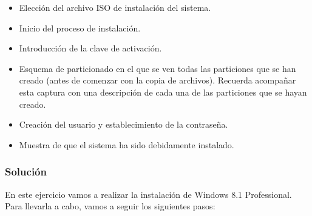 \begin{itemize}
    \item Elección del archivo ISO de instalación del sistema.
    \item Inicio del proceso de instalación.
    \item Introducción de la clave de activación.
    \item Esquema de particionado en el que se ven todas las particiones que se han creado (antes de comenzar con la copia de archivos). Recuerda acompañar esta captura con una descripción de cada una de las particiones que se hayan creado.
    \item Creación del usuario y establecimiento de la contraseña.
    \item Muestra de que el sistema ha sido debidamente instalado.
\end{itemize}

\subsubsection{Solución}
En este ejercicio vamos a realizar la instalación de Windows 8.1 Professional. Para llevarla a cabo, vamos a seguir los siguientes pasos:

